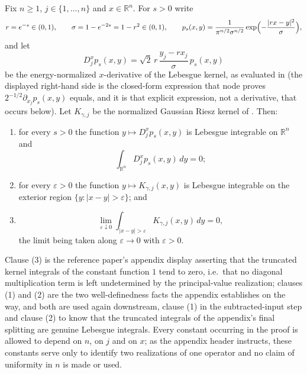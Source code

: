 \begin{lemma}
Fix $n \geq 1$, $j \in \{1,\ldots,n\}$ and $x \in \mathbb{R}^n$.  For $s > 0$ write
\[
  r = e^{-s} \in (0,1), \qquad \sigma = 1 - e^{-2s} = 1 - r^2 \in (0,1),
  \qquad
  p_s(x,y) = \frac{1}{\pi^{n/2}\sigma^{n/2}}\exp\Bigl(-\frac{|rx-y|^2}{\sigma}\Bigr) ,
\]
and let
\[
  D_j^x p_s(x,y) = \sqrt2\,r\,\frac{y_j - r x_j}{\sigma}\,p_s(x,y)
\]
be the energy-normalized $x$-derivative of the Lebesgue kernel, as evaluated in
 (the displayed right-hand side is the
closed-form expression that node proves $2^{-1/2}\partial_{x_j}p_s(x,y)$ equals,
and it is that explicit expression, not a derivative, that occurs below).  Let
$K_{\gamma,j}$ be the normalized Gaussian Riesz kernel of
.  Then:
\begin{enumerate}
\item for every $s > 0$ the function $y \mapsto D_j^xp_s(x,y)$ is Lebesgue
integrable on $\mathbb{R}^n$ and
\[
  \int_{\mathbb{R}^n} D_j^xp_s(x,y)\,dy = 0 ;
\]
\item for every $\varepsilon > 0$ the function $y \mapsto K_{\gamma,j}(x,y)$ is
Lebesgue integrable on the exterior region $\{y : |x-y| > \varepsilon\}$; and
\item
\[
  \lim_{\varepsilon\downarrow0}
    \int_{|x-y|>\varepsilon} K_{\gamma,j}(x,y)\,dy = 0 ,
\]
the limit being taken along $\varepsilon \to 0$ with $\varepsilon > 0$.
\end{enumerate}

Clause (3) is the reference paper's appendix display asserting that the
truncated kernel integrals of the constant function $1$ tend to zero, i.e.\ that
no diagonal multiplication term is left undetermined by the principal-value
realization; clauses (1) and (2) are the two well-definedness facts the
appendix establishes on the way, and both are used again downstream, clause (1)
in the subtracted-input step and clause (2) to know that the truncated integrals
of the appendix's final splitting are genuine Lebesgue integrals.  Every
constant occurring in the proof is allowed to depend on $n$, on $j$ and on $x$;
as the appendix header instructs, these constants serve only to identify two
realizations of one operator and no claim of uniformity in $n$ is made or used.
\end{lemma}
